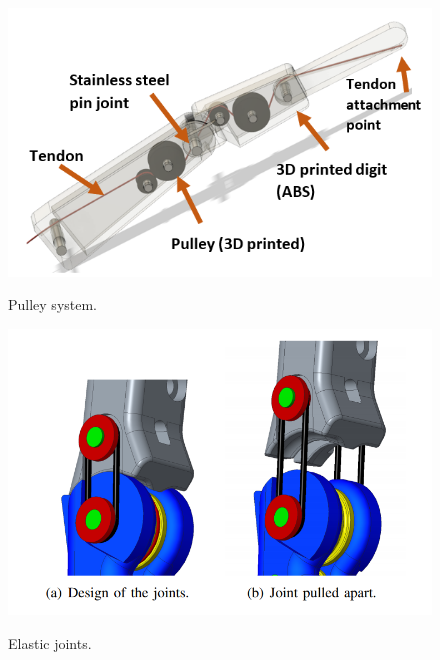 \documentclass[11pt,3p]{report}
\begin{document}
\footnotesize
\begin{figure}[!b]
  \centering
  \begin{minipage}[b]{0.2\textwidth}
    \includegraphics[width=\textwidth]{pulley} \label{pulleysys}
    \caption{Pulley system.}
  \end{minipage}
  \hfill
  \begin{minipage}[b]{0.2\textwidth}
    \includegraphics[width=\textwidth]{Elasticjoint} \label{eljoint}
    \caption{Elastic joints.}
  \end{minipage}
  \hfill
  \begin{minipage}[b]{0.2\textwidth}

\end{minipage}
\end{figure}
\end{document}
